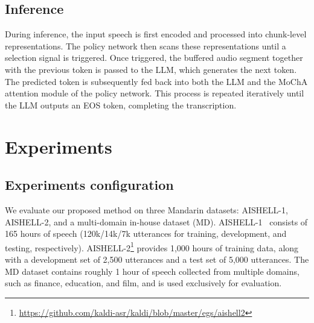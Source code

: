 \documentclass{article}
\begin{document}
\subsection{Inference}
During inference, the input speech is first encoded and processed into chunk-level representations.
The policy network then scans these representations until a selection signal is triggered.
Once triggered, the buffered audio segment together with the previous token is passed to the LLM, which generates the next token.
The predicted token is subsequently fed back into both the LLM and the MoChA attention module of the policy network.
This process is repeated iteratively until the LLM outputs an EOS token, completing the transcription.


\section{Experiments}
\subsection{Experiments configuration}
We evaluate our proposed method on three Mandarin datasets: AISHELL-1, AISHELL-2, and a multi-domain in-house dataset (MD).
AISHELL-1~\cite{bu2017aishell} 
 consists of 165 hours of speech (120k/14k/7k utterances for training, development, and testing, respectively).
AISHELL-2\footnote{\url{https://github.com/kaldi-asr/kaldi/blob/master/egs/aishell2}}
 provides 1,000 hours of training data, along with a development set of 2,500 utterances and a test set of 5,000 utterances.
The MD dataset contains roughly 1 hour of speech collected from multiple domains, such as finance, education, and film, and is used exclusively for evaluation.
\end{document}
